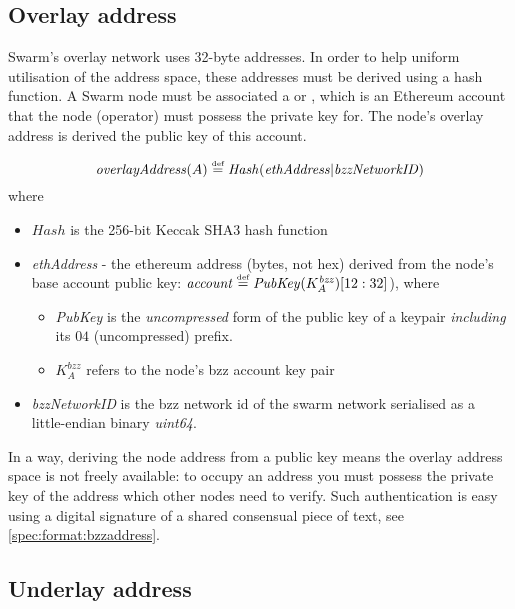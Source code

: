 \subsection{Overlay address \statusyellow}

Swarm's overlay network uses 32-byte addresses. In order to help  uniform utilisation of the address space,  these addresses must be derived using a hash function. A Swarm node must be associated a  or , which is an Ethereum account that the node (operator) must possess the private key for. The node's overlay address is derived the public key of this account. 

\begin{definition}\label{def:buzzoverlay}
\begin{equation}
\mathit{overlayAddress}(A) \overset{\textrm{\tiny def}}{=} \mathit{Hash}(\mathit{ethAddress}|\mathit{bzzNetworkID})         
\end{equation}
where
\begin{itemize}
\item $\mathit{Hash}$ is the 256-bit Keccak SHA3 hash function
\item \emph{ethAddress} - the ethereum address  (bytes,  not hex) derived from the node's base account public key: $\mathit{account}\overset{\textrm{\tiny def}}{=}\mathit{PubKey}(K_A^\mathit{bzz})[12:32]$), where
    \begin{itemize}
    \item \emph{PubKey} is the \emph{uncompressed} form of the public key of a keypair \emph{including} its $04$ (uncompressed) prefix.
    \item $K_A^\mathit{bzz}$ refers to the node's bzz account key pair
    \end{itemize}
\item \emph{bzzNetworkID} is the bzz network id of the swarm network serialised as a little-endian binary \emph{uint64}.
\end{itemize}
\end{definition}

In a way, deriving the node address from a public key means the overlay address space is not freely available: to occupy an address you must possess the private key of the address which other nodes need to verify. Such authentication is easy using a digital signature of a shared consensual piece of text, see \ref{spec:format:bzzaddress}.

\subsection{Underlay address \statusyellow}

